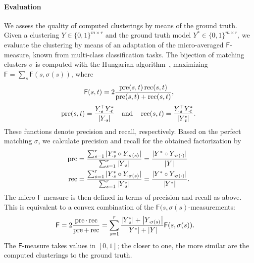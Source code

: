 \paragraph{Evaluation}
We assess the quality of computed clusterings by means of the ground truth. Given a clustering $Y\in\{0,1\}^{m\times r}$ and the ground truth model $Y^*\in\{0,1\}^{m\times r}$, we evaluate the clustering by means of an adaptation of the micro-averaged $\mathsf{F}$-measure, known from multi-class classification tasks. The bijection of matching clusters $\sigma$ is computed with the Hungarian algorithm~\citep{kuhn1955hungarian}, maximizing $\mathsf{F}=\sum_s \mathsf{F}(s,\sigma(s))$, where
\[\mathsf{F}(s,t) = 2\frac{\operatorname{pre}(s,t)\operatorname{rec}(s,t)}{\operatorname{pre}(s,t)+\operatorname{rec}(s,t)},\]
$$
\operatorname{pre}(s,t) = \frac{Y_{\cdot s}^\top Y^*_{\cdot t}}{|Y_{\cdot s}|} \quad\text{and}\quad \operatorname{rec}(s,t) = \frac{Y_{\cdot s}^\top Y^*_{\cdot t}}{|Y^*_{\cdot t}|}.
$$
These functions denote precision and recall, respectively. 
Based on the perfect matching $\sigma$, we calculate precision and recall for the obtained factorization by
\begin{align*}
\operatorname{pre} &= \frac{\sum_{s=1}^r|Y^*_{\cdot s}\circ Y_{\cdot \sigma(s)} |}{\sum_{s=1}^r|Y_{\cdot s} |} 
= \frac{|Y^*\circ Y_{\cdot \sigma(\cdot)}|}{|Y|}\\ 
\operatorname{rec} &= \frac{\sum_{s=1}^r|Y^*_{\cdot s}\circ Y_{\cdot \sigma(s)} |}{\sum_{s=1}^r|Y_{\cdot s}^* |} 
    = \frac{|Y^*\circ Y_{\cdot\sigma(\cdot)}|}{|Y^*|}.
\end{align*}
The micro $\mathsf{F}$-measure is then defined in terms of precision and recall as above. This is equivalent to a convex combination of the $\mathsf{F}(s,\sigma(s)$-measurements:  
\begin{align*}
	\mathsf{F}&=2\frac{\operatorname{pre}\cdot\operatorname{rec}}{\operatorname{pre}+\operatorname{rec}}
    = \sum_{s=1}^r\frac{\left|Y^*_{\cdot s}\right| + \left|Y_{\cdot\sigma(s)}\right|}{\left|Y^*\right|+\left|Y \right|}\mathsf{F}(s,\sigma(s)).
\end{align*}
The $\mathsf{F}$-measure takes values in $[0,1]$; the closer to one, the more similar are the computed clusterings to the ground truth. 
